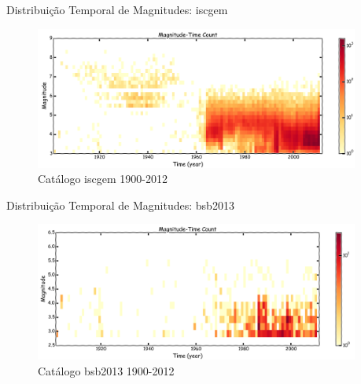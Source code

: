 \documentclass[ucs,8pt]{beamer}
\begin{document}
\begin{frame}{Distribuição Temporal de Magnitudes: \gls*{iscgem}}
\begin{figure}[H]
	\centering
	\includegraphics[width=0.95\textwidth]{time_mag_count_sa}
	\caption{Catálogo \gls{iscgem} 1900-2012}
	\label{fig:tmf_sa}
\end{figure}
\end{frame}


\begin{frame}{Distribuição Temporal de Magnitudes: \gls*{bsb2013}}
\begin{figure}[H]
	\centering
	\includegraphics[width=0.95\textwidth]{time_mag_count_br}
	\caption{Catálogo \gls{bsb2013} 1900-2012}
	\label{fig:tmf_br_1960}
\end{figure}%
\end{frame}
\end{document}
